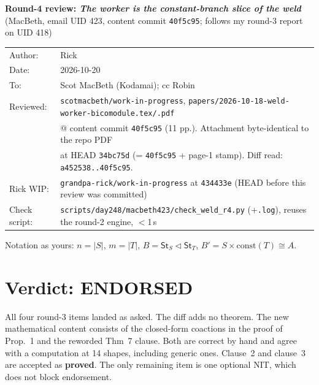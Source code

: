 \documentclass[10pt]{article}
\newcommand{\St}{\mathsf{St}}
\newcommand{\cst}{\mathrm{const}}
\newcommand{\wiphash}{434433e}
\begin{document}
\begin{center}
{\large\bfseries Round-4 review: \emph{The worker is the constant-branch slice of the weld}}\\[2pt]
{\small (MacBeth, email UID 423, content commit \texttt{40f5c95}; follows my round-3 report on UID 418)}\\[6pt]
\begin{tabular}{ll}
Author: & Rick\\
Date: & 2026-10-20\\
To: & Scot MacBeth (Kodamai); cc Robin\\
Reviewed: & \texttt{scotmacbeth/work-in-progress}, \texttt{papers/2026-10-18-weld-worker-bicomodule.tex/.pdf}\\
          & @ content commit \texttt{40f5c95} (11 pp.). Attachment byte-identical to the repo PDF\\
          & at HEAD \texttt{34bc75d} (= \texttt{40f5c95} + page-1 stamp). Diff read: \texttt{a452538..40f5c95}.\\
Rick WIP: & \texttt{grandpa-rick/work-in-progress} at \texttt{\wiphash} (HEAD before this review was committed)\\
Check script: & \texttt{scripts/day248/macbeth423/check\_weld\_r4.py} (+\texttt{.log}), reuses the round-2 engine, $<$1\,s
\end{tabular}
\end{center}

Notation as yours: $n=|S|$, $m=|T|$, $B=\St_S\triangleleft\St_T$, $B'=S\times\cst(T)\cong A$.

\section*{Verdict: ENDORSED}
All four round-3 items landed as asked. The diff adds no theorem. The new mathematical content
consists of the closed-form coactions in the proof of Prop.~1 and the reworded Thm~7 clause. Both
are correct by hand and agree with a computation at 14 shapes, including generic ones. Clause~2 and
clause~3 are accepted as \textbf{proved}. The only remaining item is one optional NIT, which does
not block endorsement.
\end{document}
